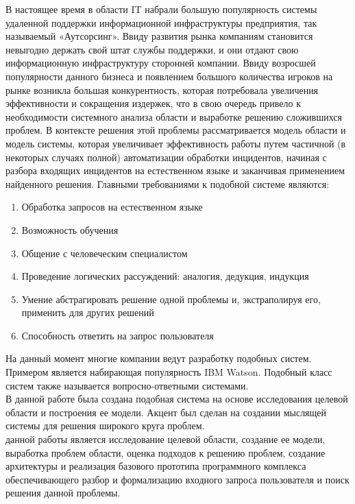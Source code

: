 {\actuality}
В настоящее время в области IT набрали большую популярность системы удаленной поддержки информационной инфраструктуры предприятия, так называемый «Аутсорсинг». Ввиду развития рынка компаниям становится невыгодно держать свой штат службы поддержки, и они отдают свою информационную инфраструктуру сторонней компании.
Ввиду возросшей популярности данного бизнеса и появлением большого количества игроков на рынке возникла большая конкурентность, которая потребовала увеличения эффективности и сокращения издержек, что в свою очередь привело к необходимости системного анализа области и выработке решению сложившихся проблем. В контексте решения этой проблемы рассматривается модель области и модель системы, которая увеличивает эффективность работы путем частичной (в некоторых случаях полной) автоматизации обработки инцидентов, начиная с разбора входящих инцидентов на естественном языке и заканчивая применением найденного решения. 
Главными требованиями к подобной системе являются:
\begin{enumerate}
  \item Обработка запросов на естественном языке
  \item Возможность обучения
  \item Общение с человеческим специалистом
  \item Проведение логических рассуждений: аналогия, дедукция, индукция
  \item Умение абстрагировать решение одной проблемы и, экстраполируя его, применить для других решений
  \item Способность ответить на запрос пользователя
\end{enumerate}

На данный момент многие компании ведут разработку подобных систем. Примером является набирающая популярность IBM Watson. Подобный класс систем также называется вопросно-ответными системами. \\
В данной работе была создана подобная система на основе исследования целевой области и построения ее модели.
 Акцент был сделан на создании мыслящей системы для решения широкого круга проблем. \\
{\aim} данной работы является исследование целевой области, создание ее модели, выработка проблем области, оценка подходов к решению проблем,  создание архитектуры и реализация базового прототипа программного комплекса обеспечивающего разбор и формализацию входного запроса пользователя и поиск решения данной проблемы.

